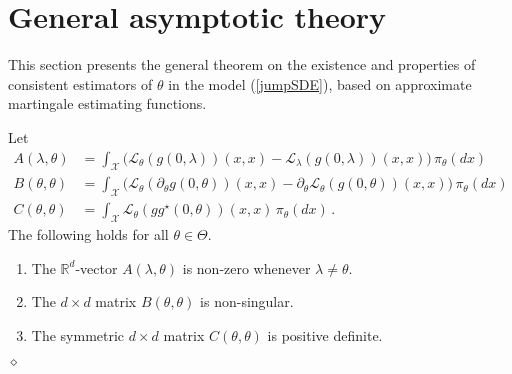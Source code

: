 \documentclass[11pt,a4paper]{article}
\newcommand{\RR}{{\mathbb R}}
\renewcommand{\ll}{{\mathcal{L}}}
\newcommand{\xx}{{\mathcal{X}}}
\newcommand{\dqed}{{\leavevmode \unskip \penalty9999 \hbox{} \nobreak \hfill \quad \hbox{$\diamond$}}}
\numberwithin{equation}{section}
\numberwithin{theorem}{section}
\begin{document}
\section{General asymptotic theory}\label{sec:general_jump}
This section presents the general theorem on the existence and properties of consistent estimators of $\theta$ in the model (\ref{jumpSDE}), based on approximate martingale estimating functions.
%
\begin{assumption}
Let 
\begin{align*}
A(\lambda, \theta) &= \int_\xx \big( \ll_\theta(g(0, \lambda)) (x,x) -\ll_\lambda(g(0, \lambda)) (x,x)\big)\, \pi_\theta(dx)\\
B(\theta, \theta) &= \int_\xx\big(  \ll_\theta(\partial_\theta g(0, \theta))(x,x) - \partial_\theta \ll_\theta(g(0,\theta))(x,x) \big)\, \pi_\theta(dx)\\
C(\theta, \theta) &= \int_\xx \ll_\theta(gg^\star (0,\theta))(x,x)\,\pi_\theta(dx)\,.
\end{align*}
%
The following holds for all $\theta \in \Theta$.
\begin{enumerate}[label=(\roman{*}), ref=(\roman{*})]
\item \label{LdiffNZ} The $\RR^d$-vector $A(\lambda, \theta)$ is non-zero whenever $\lambda \neq \theta$. 
\item \label{dthetalimitNS} The $d\times d$ matrix $B(\theta, \theta)$ is non-singular.
\item \label{Cposdef} The symmetric $d\times d$ matrix $C(\theta,\theta)$ is positive definite.
\end{enumerate}\dqed
\label{assumptions_for_estimators}
\end{assumption}
%
\end{document}
